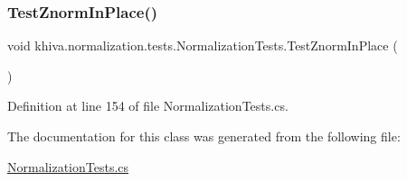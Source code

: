 \mbox{\label{classkhiva_1_1normalization_1_1tests_1_1_normalization_tests_a63dd8cfff79eb91053d9bf45990f691c}} 
\subsubsection{\texorpdfstring{Test\+Znorm\+In\+Place()}{TestZnormInPlace()}}
{\footnotesize\ttfamily void khiva.\+normalization.\+tests.\+Normalization\+Tests.\+Test\+Znorm\+In\+Place (\begin{DoxyParamCaption}{ }\end{DoxyParamCaption})\hspace{0.3cm}{\ttfamily [inline]}}



Definition at line 154 of file Normalization\+Tests.\+cs.



The documentation for this class was generated from the following file\+:\begin{DoxyCompactItemize}
\item 
\mbox{\hyperlink{_normalization_tests_8cs}{Normalization\+Tests.\+cs}}\end{DoxyCompactItemize}
